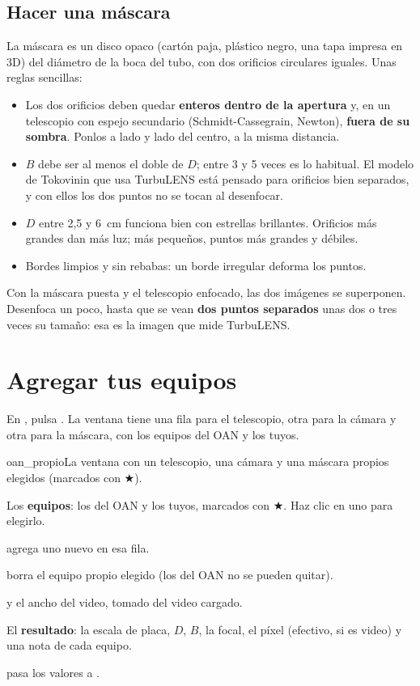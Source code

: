 \subsection{Hacer una máscara}

La máscara es un disco opaco (cartón paja, plástico negro, una tapa impresa en 3D) del diámetro de la boca del tubo, con
dos orificios circulares iguales. Unas reglas sencillas:
\begin{itemize}
\item Los dos orificios deben quedar \textbf{enteros dentro de la apertura} y, en un telescopio con espejo secundario
(Schmidt-Cassegrain, Newton), \textbf{fuera de su sombra}. Ponlos a lado y lado del centro, a la misma distancia.
\item $B$ debe ser al menos el doble de $D$; entre 3 y 5 veces es lo habitual. El modelo de Tokovinin que usa TurbuLENS
está pensado para orificios bien separados, y con ellos los dos puntos no se tocan al desenfocar.
\item $D$ entre 2,5 y 6~cm funciona bien con estrellas brillantes. Orificios más grandes dan más luz; más pequeños, puntos
más grandes y débiles.
\item Bordes limpios y sin rebabas: un borde irregular deforma los puntos.
\end{itemize}
Con la máscara puesta y el telescopio enfocado, las dos imágenes se superponen. Desenfoca un poco, hasta que se vean
\textbf{dos puntos separados} unas dos o tres veces su tamaño: esa es la imagen que mide TurbuLENS.

\section{Agregar tus equipos}\label{sec:agregar}

En , pulsa . La ventana tiene una fila para el telescopio, otra
para la cámara y otra para la máscara, con los equipos del OAN y los tuyos.

\begin{capturam}[0.94\linewidth]{oan_propio}{La ventana  con un telescopio, una cámara y una máscara
propios elegidos (marcados con ★).}
\item Los \textbf{equipos}: los del OAN y los tuyos, marcados con ★. Haz clic en uno para elegirlo.
\item {} agrega uno nuevo en esa fila.
\item {} borra el equipo propio elegido (los del OAN no se pueden quitar).
\item {} y el ancho del video, tomado del video cargado.
\item El \textbf{resultado}: la escala de placa, $D$, $B$, la focal, el píxel (efectivo, si es video) y una nota de cada equipo.
\item {} pasa los valores a .
\end{capturam}

